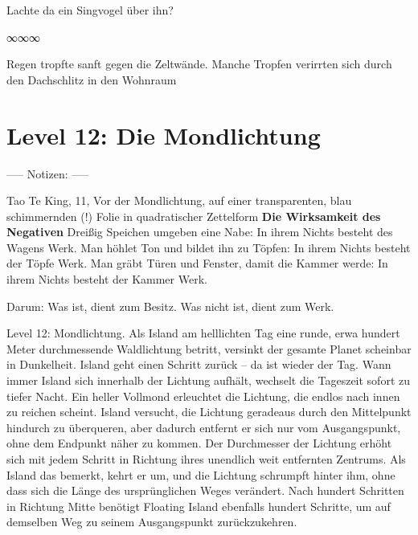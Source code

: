 Lachte da ein Singvogel über ihn?

\begin{center}
	∞∞∞
\end{center}

Regen tropfte sanft gegen die Zeltwände. Manche Tropfen verirrten sich durch den Dachschlitz in den Wohnraum














\section{Level 12: Die Mondlichtung}

----- Notizen: -----

Tao Te King, 11, Vor der Mondlichtung, auf einer transparenten, blau schimmernden (!) Folie in quadratischer Zettelform
\textbf{Die Wirksamkeit des Negativen}
Dreißig Speichen umgeben eine Nabe:
In ihrem Nichts besteht des Wagens Werk.
Man höhlet Ton und bildet ihn zu Töpfen:
In ihrem Nichts besteht der Töpfe Werk.
Man gräbt Türen und Fenster, damit die Kammer werde:
In ihrem Nichts besteht der Kammer Werk.

Darum: Was ist, dient zum Besitz.
Was nicht ist, dient zum Werk.

    Level 12: Mondlichtung. Als Island am helllichten Tag eine runde, erwa hundert Meter durchmessende Waldlichtung betritt, versinkt der gesamte Planet scheinbar in Dunkelheit. Island geht einen Schritt zurück – da ist wieder der Tag. Wann immer Island sich innerhalb der Lichtung aufhält, wechselt die Tageszeit sofort zu tiefer Nacht. Ein heller Vollmond erleuchtet die Lichtung, die endlos nach innen zu reichen scheint. Island versucht, die Lichtung geradeaus durch den Mittelpunkt hindurch zu überqueren, aber dadurch entfernt er sich nur vom Ausgangspunkt, ohne dem Endpunkt näher zu kommen. Der Durchmesser der Lichtung erhöht sich mit jedem Schritt in Richtung ihres unendlich weit entfernten Zentrums. Als Island das bemerkt, kehrt er um, und die Lichtung schrumpft hinter ihm, ohne dass sich die Länge des ursprünglichen Weges verändert. Nach hundert Schritten in Richtung Mitte benötigt Floating Island ebenfalls hundert Schritte, um auf demselben Weg zu seinem Ausgangspunkt zurückzukehren.

